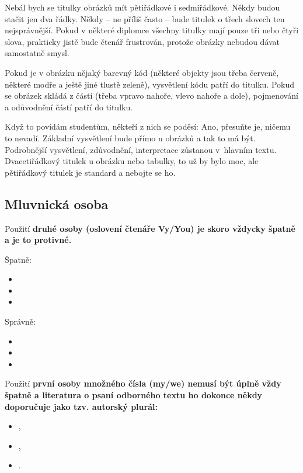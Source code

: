 Nebál bych se titulky obrázků mít pětiřádkové i sedmiřádkové. Někdy budou stačit jen dva řádky. Někdy -- ne příliš často -- bude titulek o třech slovech ten nejsprávnější. Pokud v některé diplomce všechny titulky mají pouze tři nebo čtyři slova, prakticky jistě bude čtenář frustrován, protože obrázky nebudou dávat samostatně smysl.

Pokud je v obrázku nějaký barevný kód (některé objekty jsou třeba červeně, některé modře a ještě jiné tlustě zeleně), vysvětlení kódu patří do titulku. Pokud se obrázek skládá z částí (třeba vpravo nahoře, vlevo nahoře a dole), pojmenování a odůvodnění částí patří do titulku.

Když to povídám studentům, někteří z nich se poděsí:  Ano, přesuňte je, ničemu to nevadí. Základní vysvětlení bude přímo u obrázků a tak to má být. Podrobnější vysvětlení, zdůvodnění, interpretace zůstanou v~hlavním textu. Dvacetiřádkový titulek u obrázku nebo tabulky, to už by bylo moc, ale pětiřádkový titulek je standard a nebojte se ho.

\subsection*{Mluvnická osoba}

Použití \bf druhé osoby \rm (oslovení čtenáře Vy/You) je skoro vždycky špatně a je to protivné.

Špatně:
\begin{itemize}
  \item{}
  \item{}
  \item{}
\end{itemize}

Správně:
\begin{itemize}
  \item{}
  \item{}
  \item{}
\end{itemize}

Použití \bf první osoby množného čísla \rm (my/we) nemusí být úplně vždy špatně a  literatura o psaní odborného textu ho dokonce někdy doporučuje jako tzv. autorský plurál:
\begin{itemize}
  \item{},
  \item{},
  \item{}.
\end{itemize}

